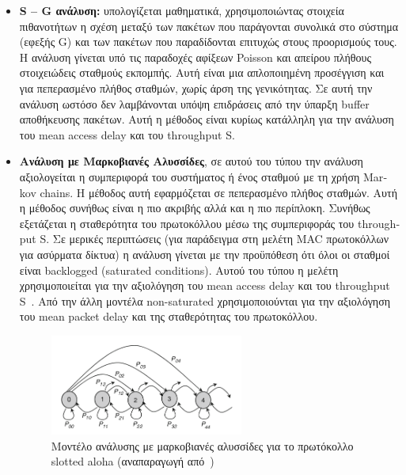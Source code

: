\documentclass[12pt]{report}
\begin{document}
\begin{itemize}
  \item \textbf{\textlatin{S – G} ανάλυση:} υπολογίζεται μαθηματικά, χρησιμοποιώντας στοιχεία πιθανοτήτων  η σχέση μεταξύ των πακέτων που παράγονται συνολικά στο σύστημα (εφεξής \textlatin{G}) και των πακέτων που παραδίδονται επιτυχώς στους προορισμούς τους. Η ανάλυση γίνεται υπό τις παραδοχές αφίξεων \textlatin{Poisson} και απείρου πλήθους στοιχειώδεις σταθμούς εκπομπής. Αυτή είναι μια απλοποιημένη προσέγγιση και για πεπερασμένο πλήθος σταθμών, χωρίς άρση της γενικότητας. Σε αυτή την ανάλυση ωστόσο δεν λαμβάνονται υπόψη επιδράσεις από την ύπαρξη \textlatin{buffer} αποθήκευσης πακέτων. Αυτή η μέθοδος είναι κυρίως κατάλληλη για την ανάλυση του \textlatin{mean access delay} και του \textlatin{throughput S}.

  \item \textbf{Ανάλυση με Μαρκοβιανές Αλυσσίδες}, σε αυτού του τύπου την ανάλυση αξιολογείται η συμπεριφορά του συστήματος ή ένος σταθμού με τη χρήση \textlatin{Markov chains}. Η μέθοδος αυτή εφαρμόζεται σε πεπερασμένο πλήθος σταθμών. Αυτή η μέθοδος συνήθως είναι η πιο ακριβής αλλά και η πιο περίπλοκη. Συνήθως εξετάζεται η σταθερότητα του πρωτοκόλλου μέσω της συμπεριφοράς του \textlatin{throughput S}. Σε μερικές περιπτώσεις (για παράδειγμα στη μελέτη \textlatin{MAC} πρωτοκόλλων για ασύρματα δίκτυα) η ανάλυση γίνεται με την προϋπόθεση ότι όλοι οι σταθμοί είναι \textlatin{backlogged (saturated conditions)}. Αυτού του τύπου η μελέτη χρησιμοποιείται για την αξιολόγηση του \textlatin{mean access delay} και του \textlatin{throughput S}~\cite{paper:01}. Από την άλλη μοντέλα \textlatin{non-saturated} χρησιμοποιούνται για την αξιολόγηση του \textlatin{mean packet delay} και της σταθερότητας του πρωτοκόλλου.

  \begin{figure}[ht]
  \centering
  \includegraphics[width=0.6\textwidth]{markov_chain}
  \caption{Μοντέλο ανάλυσης με μαρκοβιανές αλυσσίδες για το πρωτόκολλο \textlatin{slotted aloha} (αναπαραγωγή από~\cite{book:01})}
  \label{fig:markov_chain}
  \end{figure}


\end{itemize}
\end{document}
